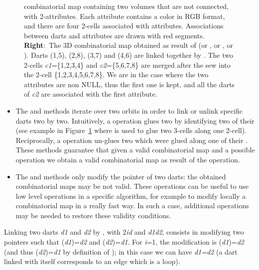\begin{figure}
{    combinatorial map containing two volumes that are not connected,
    with 2-attributes. Each attribute contains a color in RGB format,
    and there are four 2-cells associated with attributes.
    Associations between darts and attributes are drawn with red
    segments. \textbf{Right}:~The 3D combinatorial map obtained as
    result of  (or , or
    , or ). Darts (1,5), (2,8),
    (3,7) and (4,6) are linked together by \betatrois{}. The two 2-cells
    \emph{c1}=\{1,2,3,4\} and \emph{c2}=\{5,6,7,8\} are merged after the sew
    into the 2-cell \{1,2,3,4,5,6,7,8\}. We are in the case where
    the two attributes are non NULL, thus the first one is kept, and
    all the darts of \emph{c2} are associated with the first attribute.}
  \label{fig-exemple-sew}
\end{figure}
\begin{itemize}
\item The  and  methods iterate over two orbits in
  order to link or unlink specific darts two by two.  Intuitively, a
   operation glues two  by identifying two of
  their  (see example in Figure~\ref{fig-exemple-sew}
  where  is used to glue two 3-cells along one 2-cell).
  Reciprocally, a  operation un-glues two  which
  were glued along one of their .
  These methods guarantee that given a valid combinatorial map and a
  possible operation we obtain a valid combinatorial map as result of
  the operation.

\item
\begin{ccAdvanced}
  The  and  methods only modify
  the pointer of two darts: the obtained combinatorial maps may be not
  valid. These operations can be useful to use low level operations
  in a specific algorithm, for example to modify locally a
  combinatorial map in a really fast way. In such a case, additional
  operations may be needed to restore these validity conditions.
\end{ccAdvanced}
\end{itemize}

Linking two darts \emph{d1} and \emph{d2} by \betai{}, with 2\myleq{}\emph{i}\myleq{}\emph{d}
and \emph{d1}\myneq{}\emph{d2}, consists in modifying two \betai{} pointers such that
\betai{}(\emph{d1})=\emph{d2} and \betai{}(\emph{d2})=\emph{d1}. For \emph{i}=1, the modification
is \betaun{}(\emph{d1})=\emph{d2} (and thus \betazero{}(\emph{d2})=\emph{d1} by definition of
\betazero{}); in this case we can have \emph{d1=d2} (a dart linked with
itself corresponds to an edge which is a loop).

